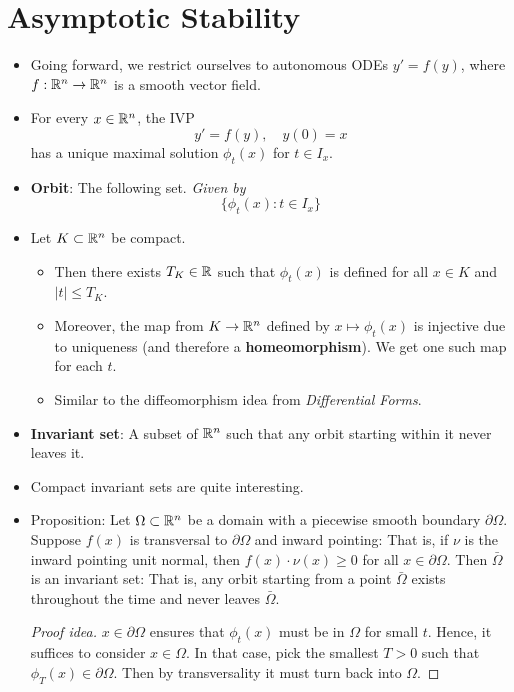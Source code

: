 \documentclass[../notes.tex]{subfiles}
\begin{document}
\section{Asymptotic Stability}
\begin{itemize}
    \item {}Going forward, we restrict ourselves to autonomous ODEs $y'=f(y)$, where $f:\mathbb{R}^n\to\mathbb{R}^n$ is a smooth vector field.
    \item For every $x\in\mathbb{R}^n$, the IVP
    \begin{equation*}
        y' = f(y)
        ,\quad
        y(0) = x
    \end{equation*}
    has a unique maximal solution $\phi_t(x)$ for $t\in I_x$.
    \item \textbf{Orbit}: The following set. \emph{Given by}
    \begin{equation*}
        \{\phi_t(x):t\in I_x\}
    \end{equation*}
    \item Let $K\subset\mathbb{R}^n$ be compact.
    \begin{itemize}
        \item Then there exists $T_K\in\mathbb{R}$ such that $\phi_t(x)$ is defined for all $x\in K$ and $|t|\leq T_K$.
        \item Moreover, the map from $K\to\mathbb{R}^n$ defined by $x\mapsto\phi_t(x)$ is injective due to uniqueness (and therefore a \textbf{homeomorphism}). We get one such map for each $t$.
        \item Similar to the diffeomorphism idea from \emph{Differential Forms}.
    \end{itemize}
    \item \textbf{Invariant set}: A subset of $\mathbb{R}^n$ such that any orbit starting within it never leaves it.
    \item Compact invariant sets are quite interesting.
    \item Proposition: Let $\Omega\subset\mathbb{R}^n$ be a domain with a piecewise smooth boundary $\partial\Omega$. Suppose $f(x)$ is transversal to $\partial\Omega$ and inward pointing: That is, if $\nu$ is the inward pointing unit normal, then $f(x)\cdot\nu(x)\geq 0$ for all $x\in\partial\Omega$. Then $\bar{\Omega}$ is an invariant set: That is, any orbit starting from a point $\bar{\Omega}$ exists throughout the time and never leaves $\bar{\Omega}$.
    \begin{proof}[Proof idea]
        $x\in\partial\Omega$ ensures that $\phi_t(x)$ must be in $\Omega$ for small $t$. Hence, it suffices to consider $x\in\Omega$. In that case, pick the smallest $T>0$ such that $\phi_T(x)\in\partial\Omega$. Then by transversality it must turn back into $\Omega$.

\end{proof}
\end{itemize}
\end{document}
